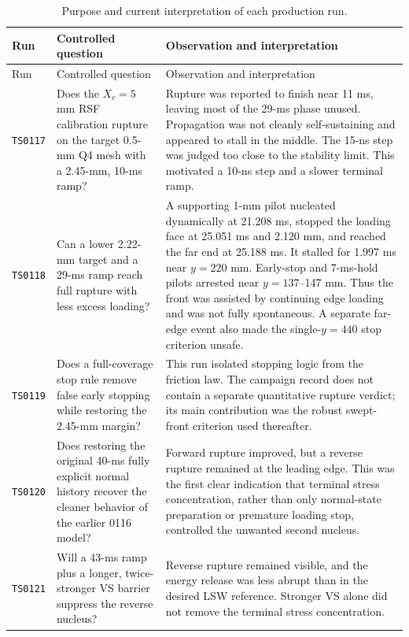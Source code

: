 \documentclass[11pt]{article}
\newcommand{\run}[1]{\texttt{TS#1}}
\begin{document}
\begin{longtable}{@{}C{1.25cm}L{5.3cm}L{8.2cm}@{}}
  \caption{Purpose and current interpretation of each production run.}
  \label{tab:chronology}\\
  \toprule
  Run & Controlled question & Observation and interpretation \\
  \midrule
  \endfirsthead
  \toprule
  Run & Controlled question & Observation and interpretation \\
  \midrule
  \endhead
  \bottomrule
  \endfoot
  \run{0117} & Does the $X_c=5$ mm RSF calibration rupture on the target 0.5-mm Q4 mesh with a 2.45-mm, 10-ms ramp? & Rupture was reported to finish near 11 ms, leaving most of the 29-ms phase unused.  Propagation was not cleanly self-sustaining and appeared to stall in the middle.  The 15-ns step was judged too close to the stability limit.  This motivated a 10-ns step and a slower terminal ramp. \\
  \run{0118} & Can a lower 2.22-mm target and a 29-ms ramp reach full rupture with less excess loading? & A supporting 1-mm pilot nucleated dynamically at 21.208 ms, stopped the loading face at 25.051 ms and 2.120 mm, and reached the far end at 25.188 ms.  It stalled for 1.997 ms near $y=220$ mm.  Early-stop and 7-ms-hold pilots arrested near $y=137$--147 mm.  Thus the front was assisted by continuing edge loading and was not fully spontaneous.  A separate far-edge event also made the single-$y=440$ stop criterion unsafe. \\
  \run{0119} & Does a full-coverage stop rule remove false early stopping while restoring the 2.45-mm margin? & This run isolated stopping logic from the friction law.  The campaign record does not contain a separate quantitative rupture verdict; its main contribution was the robust swept-front criterion used thereafter. \\
  \run{0120} & Does restoring the original 40-ms fully explicit normal history recover the cleaner behavior of the earlier 0116 model? & Forward rupture improved, but a reverse rupture remained at the leading edge.  This was the first clear indication that terminal stress concentration, rather than only normal-state preparation or premature loading stop, controlled the unwanted second nucleus. \\
  \run{0121} & Will a 43-ms ramp plus a longer, twice-stronger VS barrier suppress the reverse nucleus? & Reverse rupture remained visible, and the energy release was less abrupt than in the desired LSW reference.  Stronger VS alone did not remove the terminal stress concentration. \\

\end{longtable}
\end{document}
